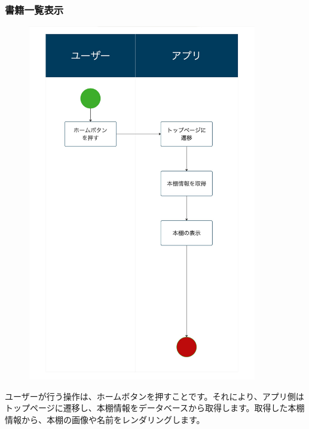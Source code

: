 \documentclass[a4paper, 11pt, titlepage]{jsarticle}
\begin{document}
\subsubsection{書籍一覧表示}
\begin{figure}[h]
  \centering
  \includegraphics[width=100mm]{flow-ichiran.jpg}
  \label{fig:func}
\end{figure}
ユーザーが行う操作は、ホームボタンを押すことです。それにより、アプリ側はトップページに遷移し、本棚情報をデータベースから取得します。取得した本棚情報から、本棚の画像や名前をレンダリングします。

\clearpage
\end{document}
